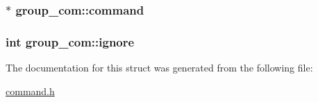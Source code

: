 \subsubsection[{\texorpdfstring{command}{command}}]{$\ast$ group\+\_\+com\+::command}\hypertarget{structgroup__com_a89f1f5171979c8f337dae8418adc6d7f}{}\label{structgroup__com_a89f1f5171979c8f337dae8418adc6d7f}
\subsubsection[{\texorpdfstring{ignore}{ignore}}]{\setlength{\rightskip}{0pt plus 5cm}int group\+\_\+com\+::ignore}\hypertarget{structgroup__com_a3715ce6245659a44296cca565fe8d7d9}{}\label{structgroup__com_a3715ce6245659a44296cca565fe8d7d9}


The documentation for this struct was generated from the following file\+:\begin{DoxyCompactItemize}
\item 
\hyperlink{command_8h}{command.\+h}\end{DoxyCompactItemize}
